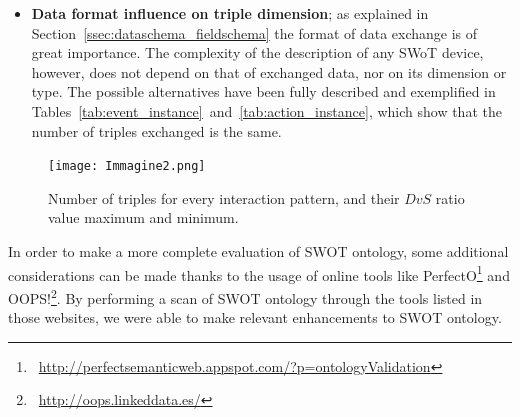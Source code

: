 \begin{itemize}
    Fig.~\ref{fig:fig5} also introduces the \textit{dynamic vs static} ($DvS$) ratio (i.e., the triple count for static description over the triple count for dynamic interaction). $DvS$ depends on the kind of interaction pattern only and is bound to the Web Thing functionality within its context. It is therefore a metric that is obtainable only once its description according to Section~\ref{ssec:interaction_patterns} has been defined by the programmer. $DvS$ ratio can be applied to a real Web Thing with all its setup: the greater the ratio, the higher the Web Thing requirements in term of real-time interactions.
    \item \textbf{Data format influence on triple dimension}; as explained in Section~\ref{ssec:dataschema_fieldschema} the format of data exchange is of great importance. The complexity of the description of any SWoT device, however, does not depend on that of exchanged data, nor on its dimension or type. The possible alternatives have been fully described and exemplified in Tables~\ref{tab:event_instance}~and~\ref{tab:action_instance}, which show that the number of triples exchanged is the same. 
\end{itemize}

\begin{figure}
    \vspace{10pt}
    \centering
    \texttt{[image: Immagine2.png]}
    \vspace{10pt}
    \caption{Number of triples for every interaction pattern, and their $DvS$ ratio value maximum and minimum.}
    \label{fig:fig5}
\end{figure}


In order to make a more complete evaluation of SWOT ontology, some additional considerations can be made thanks to the usage of online tools like PerfectO\footnote{\faLink~\url{http://perfectsemanticweb.appspot.com/?p=ontologyValidation}} and OOPS!\footnote{\faLink~\url{http://oops.linkeddata.es/}}. By performing a scan of SWOT ontology through the tools listed in those websites, we were able to make relevant enhancements to SWOT ontology.

